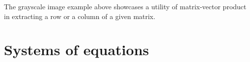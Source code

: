 \documentclass{ximera}
\begin{document}
The grayscale image example above showcases a utility of matrix-vector
product in extracting a row or a column of a given matrix.






\section{Systems of equations}
\end{document}
